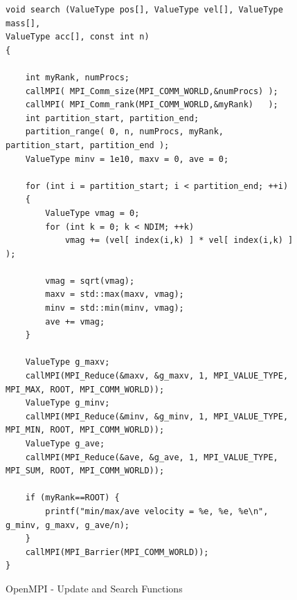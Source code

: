 \documentclass[12pt]{article} %
\begin{document}
\newpage
										
\begin{figure}[]
\caption{OpenMPI - Update and Search Functions}\label{fig:benchmark01}
\begin{lstlisting}
void search (ValueType pos[], ValueType vel[], ValueType mass[], 
ValueType acc[], const int n)
{
    
    int myRank, numProcs;
    callMPI( MPI_Comm_size(MPI_COMM_WORLD,&numProcs) );
    callMPI( MPI_Comm_rank(MPI_COMM_WORLD,&myRank)   );
    int partition_start, partition_end;
    partition_range( 0, n, numProcs, myRank, partition_start, partition_end );
    ValueType minv = 1e10, maxv = 0, ave = 0;
    
    for (int i = partition_start; i < partition_end; ++i)
    {
        ValueType vmag = 0;
        for (int k = 0; k < NDIM; ++k)
            vmag += (vel[ index(i,k) ] * vel[ index(i,k) ] );
        
        vmag = sqrt(vmag);
        maxv = std::max(maxv, vmag);
        minv = std::min(minv, vmag);
        ave += vmag;
    }
    
    ValueType g_maxv;
    callMPI(MPI_Reduce(&maxv, &g_maxv, 1, MPI_VALUE_TYPE, MPI_MAX, ROOT, MPI_COMM_WORLD));
    ValueType g_minv;
    callMPI(MPI_Reduce(&minv, &g_minv, 1, MPI_VALUE_TYPE, MPI_MIN, ROOT, MPI_COMM_WORLD));
    ValueType g_ave;
    callMPI(MPI_Reduce(&ave, &g_ave, 1, MPI_VALUE_TYPE, MPI_SUM, ROOT, MPI_COMM_WORLD));
    
    if (myRank==ROOT) {
        printf("min/max/ave velocity = %e, %e, %e\n", g_minv, g_maxv, g_ave/n);
    }
    callMPI(MPI_Barrier(MPI_COMM_WORLD));
}
\end{lstlisting}
\end{figure}
\end{document}
